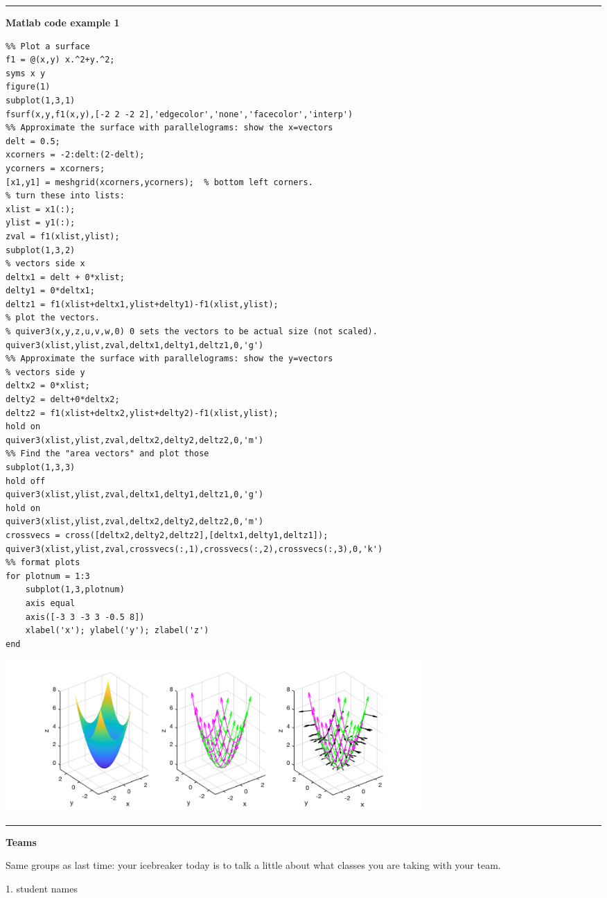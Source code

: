 \documentclass[12pt,letterpaper,noanswers]{exam}
\begin{document}
\vspace{0.2cm}
\hrule
\vspace{0.2cm}


\noindent\textbf{Matlab code example 1}
\begin{lstlisting}
%% Plot a surface
f1 = @(x,y) x.^2+y.^2;
syms x y
figure(1)
subplot(1,3,1)
fsurf(x,y,f1(x,y),[-2 2 -2 2],'edgecolor','none','facecolor','interp')
%% Approximate the surface with parallelograms: show the x=vectors
delt = 0.5;
xcorners = -2:delt:(2-delt);
ycorners = xcorners;
[x1,y1] = meshgrid(xcorners,ycorners);  % bottom left corners.
% turn these into lists:
xlist = x1(:);
ylist = y1(:);
zval = f1(xlist,ylist);
subplot(1,3,2)
% vectors side x
deltx1 = delt + 0*xlist;
delty1 = 0*deltx1;
deltz1 = f1(xlist+deltx1,ylist+delty1)-f1(xlist,ylist);
% plot the vectors.
% quiver3(x,y,z,u,v,w,0) 0 sets the vectors to be actual size (not scaled).
quiver3(xlist,ylist,zval,deltx1,delty1,deltz1,0,'g')
%% Approximate the surface with parallelograms: show the y=vectors
% vectors side y
deltx2 = 0*xlist;
delty2 = delt+0*deltx2;
deltz2 = f1(xlist+deltx2,ylist+delty2)-f1(xlist,ylist);
hold on
quiver3(xlist,ylist,zval,deltx2,delty2,deltz2,0,'m')
%% Find the "area vectors" and plot those
subplot(1,3,3)
hold off
quiver3(xlist,ylist,zval,deltx1,delty1,deltz1,0,'g')
hold on
quiver3(xlist,ylist,zval,deltx2,delty2,deltz2,0,'m')
crossvecs = cross([deltx2,delty2,deltz2],[deltx1,delty1,deltz1]);
quiver3(xlist,ylist,zval,crossvecs(:,1),crossvecs(:,2),crossvecs(:,3),0,'k')
%% format plots
for plotnum = 1:3
    subplot(1,3,plotnum)
    axis equal
    axis([-3 3 -3 3 -0.5 8])
    xlabel('x'); ylabel('y'); zlabel('z')
end
\end{lstlisting}


\includegraphics[width=0.7\textwidth]{img/C05wireframe.png}



\vspace{0.2cm}
\hrule
\vspace{0.2cm}




\noindent\textbf{Teams}

Same groups as last time: your icebreaker today is to talk a little about what classes you are taking with your team.
\begin{multicols}{2}

1.  student names

\end{multicols}
\end{document}

